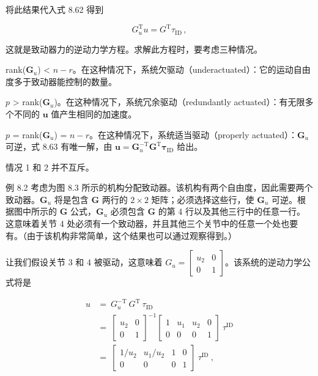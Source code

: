 \documentclass[10pt,a4paper]{book}
\theoremstyle{thmstyle} %
\theoremstyle{defstyle} %
\theoremstyle{prostyle} %
\begin{document}
将此结果代入式 8.62 得到



$$
G _ { u } ^{\mathrm { T} } u = G ^{\mathrm { T} } \tau _ { \mathrm { I D } } \, ,
$$



这就是致动器力的逆动力学方程。求解此方程时，要考虑三种情况。



rank($\boldsymbol{G}_{u}$) < $n-r$。在这种情况下，系统欠驱动（underactuated）：它的运动自由度多于致动器能控制的数量。



$p$ > rank($\boldsymbol{G}_{u}$)。在这种情况下，系统冗余驱动（redundantly actuated）：有无限多个不同的 $\boldsymbol{u}$ 值产生相同的加速度。



$p$ = rank($\boldsymbol{G}_{u}$) = $n-r$。在这种情况下，系统适当驱动（properly actuated）：$\boldsymbol{G}_{u}$ 可逆，式 8.63 有唯一解，由 $\boldsymbol{u} = \boldsymbol{G}_{u}^{-\mathrm{T}} \boldsymbol{G}^{\mathrm{T}} \boldsymbol{\tau}_{\mathrm{ID}}$ 给出。



情况 1 和 2 并不互斥。



例 8.2 考虑为图 8.3 所示的机构分配致动器。该机构有两个自由度，因此需要两个致动器。$\mathbf{G}_{u}$ 将是包含 $\mathbf{G}$ 两行的 $2 \times 2$ 矩阵；必须选择这些行，使 $\mathbf{G}_{u}$ 可逆。根据图中所示的 $\mathbf{G}$ 公式，$\mathbf{G}_{u}$ 必须包含 $\mathbf{G}$ 的第 4 行以及其他三行中的任意一行。这意味着关节 4 处必须有一个致动器，并且其他三个关节中的任意一个处也要有。（由于该机构非常简单，这个结果也可以通过观察得到。）



让我们假设关节 3 和 4 被驱动，这意味着 $G_{u} = \begin{bmatrix} u_{2} & 0 \\ 0 & 1 \end{bmatrix}$。该系统的逆动力学公式将是



$$
\begin{array}{rl} { u } & { = \ G _ { u } ^{- \mathrm { T} } \ G ^{\mathrm { T} } \ \tau _ { \mathrm { I D } } } \\& { = \ \left[ \begin{array}{llll} { u _ { 2 } } & { 0 } \\{ 0 } & { 1 } \end{array} \right] ^{- 1} \left[ \begin{array}{llll} { 1 } & { u _ { 1 } } & { u _ { 2 } } & { 0 } \\{ 0 } & { 0 } & { 0 } & { 1 } \end{array} \right] \ \tau ^{\mathrm { I D} } } \\& { = \ \left[ \begin{array}{llll} { 1 / u _ { 2 } } & { u _ { 1 } / u _ { 2 } } & { 1 } & { 0 } \\{ 0 } & { 0 } & { 0 } & { 1 } \end{array} \right] \ \tau ^{\mathrm { I D} } \ , } \end{array}
$$
\end{document}
